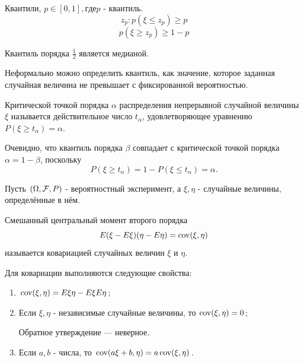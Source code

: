 \begin{definition}[Квантили]
	Квантили, $p \in [0, 1], где p$ - квантиль.
	\[ z_p: p(\xi \le z_p) \ge p \]
	\[ p(\xi \ge z_p) \ge 1 - p \]
	
	\noindent Квантиль порядка $\frac{1}{2}$ является медианой.
	\begin{figure}[H]
	\end{figure}
	Неформально можно определить квантиль, как значение, которое заданная случайная величина не превышает с фиксированной вероятностью.
\end{definition}

\begin{definition}
	Критической точкой порядка $\alpha$ распределения непрерывной случайной величины $\xi$ называется действительное число $t_{\alpha}$, удовлетворяющее уравнению $P(\xi \ge t_{\alpha}) = \alpha$.
	
	Очевидно, что квантиль порядка $\beta$ совпадает с критической точкой порядка $\alpha = 1 - \beta$, поскольку
	\[ P(\xi \ge t_{\alpha}) = 1 - P(\xi \le t_{\alpha}) = \alpha. \]
\end{definition}

\begin{definition}[Ковариация]
	Пусть $(\Omega, {\mathcal F}, P)$ - вероятностный эксперимент, а $\xi, \eta$ - случайные величины, определённые в нём.
	
	Смешанный центральный момент второго порядка
	\[ E (\xi - E\xi) (\eta - E\eta) = \operatorname{\mathop{cov}} (\xi, \eta) \]
	называется ковариацией случайных величин $\xi$ и $\eta$.
	
	Для ковариации выполняются следующие свойства:
	\begin{enumerate}
		\item $\operatorname{\mathop{cov}} (\xi, \eta) = E \xi \eta - E \xi E \eta$;
		\item Если $\xi, \eta$ - независимые случайные величины, то $\operatorname{\mathop{cov}} (\xi, \eta) = 0$;
		
		Обратное утверждение — неверное.
		
		\item Если $a, b$ - числа, то $\operatorname{\mathop{cov}} (a \xi + b, \eta) = a \operatorname{\mathop{cov}} (\xi, \eta)$.
	\end{enumerate}
\end{definition}


